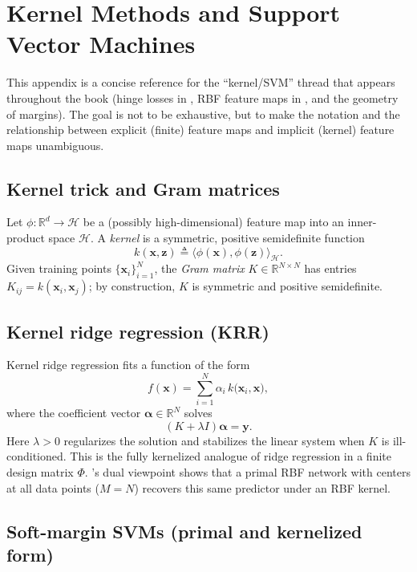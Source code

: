 \section{Kernel Methods and Support Vector Machines}\label{app:kernels}
\begingroup
\sloppy

This appendix is a concise reference for the ``kernel/SVM'' thread that appears throughout the book (hinge losses in , RBF feature maps in , and the geometry of margins). The goal is not to be exhaustive, but to make the notation and the relationship between explicit (finite) feature maps and implicit (kernel) feature maps unambiguous.

\subsection*{Kernel trick and Gram matrices}

Let \(\phi:\mathbb{R}^d\rightarrow\mathcal{H}\) be a (possibly high-dimensional) feature map into an inner-product space \(\mathcal{H}\). A \emph{kernel} is a symmetric, positive semidefinite function
\[
k(\mathbf{x},\mathbf{z}) \triangleq \langle \phi(\mathbf{x}),\phi(\mathbf{z})\rangle_{\mathcal{H}}.
\]
Given training points \(\{\mathbf{x}_i\}_{i=1}^N\), the \emph{Gram matrix} \(K\in\mathbb{R}^{N\times N}\) has entries \(K_{ij}=k(\mathbf{x}_i,\mathbf{x}_j)\); by construction, \(K\) is symmetric and positive semidefinite.

\subsection*{Kernel ridge regression (KRR)}

Kernel ridge regression fits a function of the form
\[
f(\mathbf{x})=\sum_{i=1}^N \alpha_i\, k\!\bigl(\mathbf{x}_i, \mathbf{x}\bigr),
\]
where the coefficient vector \(\boldsymbol{\alpha}\in\mathbb{R}^N\) solves
\begin{equation}
    (K+\lambda I)\boldsymbol{\alpha}=\mathbf{y}.
    \label{eq:krr}
\end{equation}
Here \(\lambda>0\) regularizes the solution and stabilizes the linear system when \(K\) is ill-conditioned. This is the fully kernelized analogue of ridge regression in a finite design matrix \(\Phi\). 's dual viewpoint shows that a primal RBF network with centers at all data points (\(M=N\)) recovers this same predictor under an RBF kernel.

\subsection*{Soft-margin SVMs (primal and kernelized form)}

